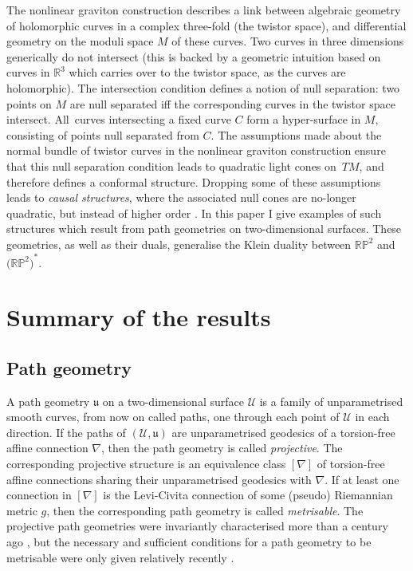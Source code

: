 \documentclass[pdftex]{sigma}%
\numberwithin{equation}{section}
\newcommand{\RP}{\mathbb{RP}}
\newcommand{\R}{\mathbb{R}}
\def\u{\mathfrak{u}}
\newcommand{\U}{\mathcal{U}}
\begin{document}
The nonlinear graviton construction describes a link between
algebraic geometry of holomorphic curves in a complex three-fold (the twistor space), and differential geometry on the moduli space $M$ of these curves. Two curves in three
dimensions generically do not intersect (this is backed by a
geometric intuition based on curves in $\R^3$ which carries over
to the twistor space, as the curves are holomorphic). The intersection
condition defines a notion of null separation: two points on $M$ are null separated iff the corresponding curves in the twistor space intersect. All~curves intersecting a fixed curve $C$ form a hyper-surface in $M$, consisting of points null separated from $C$.
The assumptions made about the normal bundle of twistor curves in the nonlinear graviton construction ensure that this null separation condition leads to quadratic light cones on~$TM$, and therefore defines a conformal structure. Dropping some of these assumptions leads to {\em causal structures}, where the associated null cones are no-longer quadratic, but instead of higher order \cite{HS1, HS2, krynski, omid}. In this paper I give examples of such
structures which result from path geometries on two-dimensional
surfaces. These geometries, as well as their duals, generalise the Klein duality between ${\RP^2}$ and ${\big(\RP^2\big)}^*$.

\section{Summary of the results}
\subsection{Path geometry}
A path geometry $\u$ on a two-dimensional surface $\U$ is a family of unparametrised smooth curves, from now on called paths, one through each point of $\U$ in each direction.
If the paths of $(\U, \u)$ are unparametrised geodesics of a torsion-free
affine connection
$\nabla$,
then the path geometry is called {\em projective}. The corresponding projective
structure is an equivalence class $[\nabla]$ of torsion-free affine
connections sharing their unparametrised geodesics with $\nabla$. If at least one connection in $[\nabla]$ is
the Levi-Civita connection of some (pseudo) Riemannian metric $g$, then the corresponding path geometry is called {\em metrisable}. The projective path geometries were invariantly characterised more than a century ago
\cite{cartan,liouville}, but the necessary and sufficient conditions for a path geometry to be metrisable were only given relatively recently \cite{BDE}.
\end{document}
